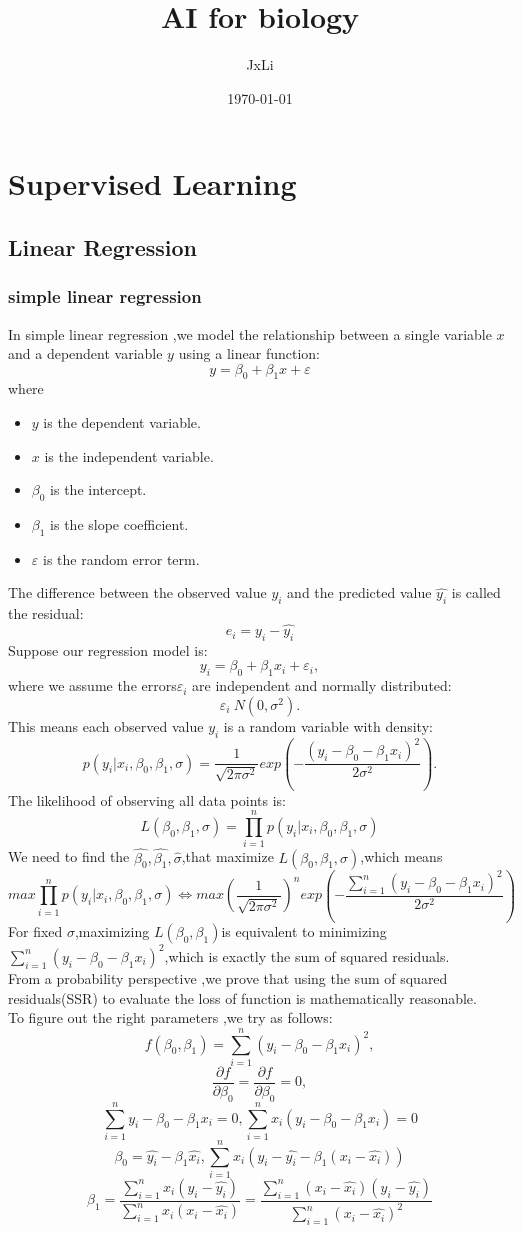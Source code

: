 \documentclass[a4paper, 12pt]{article}
\title{AI for biology}
\author{JxLi}
\date{\today}
\begin{document}
\maketitle
\section{Supervised Learning}
\subsection{Linear Regression}
\subsubsection{simple linear regression}
In simple linear regression ,we model the relationship between a single variable $x$ and a dependent variable $y$ using a linear function:
$$y = \beta_0+\beta_1 x+ \varepsilon$$
where 
\begin{itemize}
	\item $y$ is the dependent variable.
	\item $x$ is the independent variable.
	\item $\beta_0$ is the intercept.
	\item $\beta_1$ is the slope coefficient.
	\item $\varepsilon$ is the random error term.
\end{itemize}
The difference between the observed value $y_i$ and the predicted value $\hat{y_i}$ is called the residual:
$$e_i=y_i-\hat{y_i}$$
Suppose our regression model is:
$$y_i=\beta_0+\beta_1 x_i +\varepsilon_i,$$
where we assume the errors$\varepsilon_i$ are independent and normally distributed:
$$\varepsilon_i ~ N(0,\sigma^2).$$
This means each observed value $y_i$ is a random variable with density:
$$p(y_i|x_i,\beta_0,\beta_1,\sigma)=\frac{1}{\sqrt{2\pi \sigma^2}}exp(-\frac{(y_i-\beta_0-\beta_1x_i)^2}{2\sigma^2}).$$
The likelihood of observing all data points is:
$$L(\beta_0,\beta_1,\sigma)=\prod_{i=1}^{n}p(y_i|x_i,\beta_0,\beta_1,\sigma)$$
We need to find the $\hat{\beta_0},\hat{\beta_1},\hat{\sigma}$,that maximize $L(\beta_0,\beta_1,\sigma)$,which means
$$max \prod_{i=1}^{n}p(y_i|x_i,\beta_0,\beta_1,\sigma)\Leftrightarrow max (\frac{1}{\sqrt{2\pi \sigma^2}})^n exp(-\frac{\sum_{i=1}^{n}(y_i-\beta_0-\beta_1 x_i)^2}{2\sigma^2})$$
For fixed $\sigma$,maximizing $L(\beta_0,\beta_1)$is equivalent to minimizing $\sum_{i=1}^{n}(y_i-\beta_0-\beta_1x_i)^2$,which is exactly the sum of squared residuals.\\
From a probability perspective ,we prove that using the sum of squared residuals(SSR) to evaluate the loss of function is mathematically reasonable.\\
To figure out the right parameters ,we try as follows:
$$f(\beta_0,\beta_1)=\sum_{i=1}^{n}(y_i-\beta_0-\beta_1x_i)^2,$$ 
$$\frac{\partial{f}}{\partial \beta_0}=\frac{\partial{f}}{\partial \beta_0}=0,$$
$$\sum_{i=1}^{n}y_i-\beta_0 -\beta_1 x_i=0,\sum_{i=1}^{n}x_i(y_i-\beta_0-\beta_1x_i)=0$$
$$\beta_0=\hat{y_i}-\beta_1\hat{x_i},\sum_{i=1}^{n}x_i(y_i-\hat{y_i}-\beta_1(x_i-\hat{x_i}))$$
$$\beta_1=\frac{\sum_{i=1}^n x_i(y_i-\hat{y_i})}{\sum_{i=1}^n x_i(x_i-\hat{x_i})}=\frac{\sum_{i=1}^n (x_i-\hat{x_i})(y_i-\hat{y_i})}{\sum_{i=1}^n (x_i-\hat{x_i})^2}$$
\end{document}
